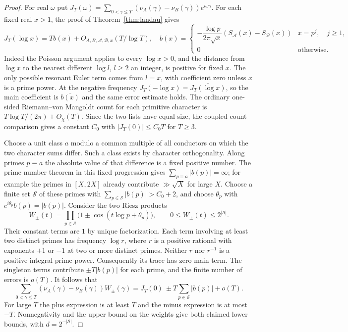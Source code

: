 \begin{proof}
For real $\omega$ put $J_T(\omega)=\sum_{0<\gamma\le T}(\nu_A(\gamma)-\nu_B(\gamma))e^{i\omega\gamma}$. For each fixed real $x>1$, the proof of Theorem~\ref{thm:landau} gives
\[
 J_T(\log x)=T b(x)+O_{A,B,\mathcal A,\mathcal B,x}(T/\log T),
 \quad
 b(x)=\begin{cases}
 -\dfrac{\log p}{2\pi\sqrt x}(S_{\mathcal A}(x)-S_{\mathcal B}(x)) &x=p^j,\quad j\ge1,\\[3pt]
 0 &\text{otherwise}.
 \end{cases}
\]
Indeed the Poisson argument applies to every $\log x>0$, and the distance from $\log x$ to the nearest different $\log l$, $l\ge2$ an integer, is positive for fixed $x$. The only possible resonant Euler term comes from $l=x$, with coefficient zero unless $x$ is a prime power. At the negative frequency $J_T(-\log x)=\overline{J_T(\log x)}$, so the main coefficient is $\overline{b(x)}$ and the same error estimate holds. The ordinary one-sided Riemann--von Mangoldt count for each primitive character is $T\log T/(2\pi)+O_\chi(T)$. Since the two lists have equal size, the coupled count comparison gives a constant $C_0$ with $|J_T(0)|\le C_0 T$ for $T\ge3$.

Choose a unit class $a$ modulo a common multiple of all conductors on which the two character sums differ. Such a class exists by character orthogonality. Along primes $p\equiv a$ the absolute value of that difference is a fixed positive number. The prime number theorem in this fixed progression gives $\sum_{p\equiv a}|b(p)|=\infty$; for example the primes in $[X,2X]$ already contribute $\gg\sqrt X$ for large $X$. Choose a finite set $\mathcal S$ of these primes with $\sum_{p\in\mathcal S}|b(p)|>C_0+2$, and choose $\theta_p$ with $e^{i\theta_p}b(p)=|b(p)|$. Consider the two Riesz products
\[
 W_\pm(t)=\prod_{p\in\mathcal S}\bigl(1\pm\cos(t\log p+\theta_p)\bigr),\qquad
 0\le W_\pm(t)\le 2^{|\mathcal S|}.
\]
Their constant terms are $1$ by unique factorization. Each term involving at least two distinct primes has frequency $\log r$, where $r$ is a positive rational with exponents $+1$ or $-1$ at two or more distinct primes. Neither $r$ nor $r^{-1}$ is a positive integral prime power. Consequently its trace has zero main term. The singleton terms contribute $\pm T|b(p)|$ for each prime, and the finite number of errors is $o(T)$. It follows that
\[
 \sum_{0<\gamma\le T}(\nu_A(\gamma)-\nu_B(\gamma))W_\pm(\gamma)
 =J_T(0)\ \pm T\sum_{p\in\mathcal S}|b(p)|+o(T).
\]
For large $T$ the plus expression is at least $T$ and the minus expression is at most $-T$. Nonnegativity and the upper bound on the weights give both claimed lower bounds, with $d=2^{-|\mathcal S|}$.
\end{proof}

